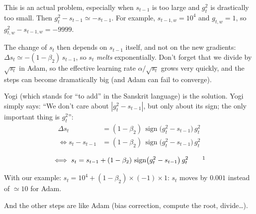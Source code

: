 This is an actual problem, especially when $s_{t-1}$ is too large and $g_t^2$ is drastically too small. Then $g_t^2-s_{t-1}\simeq-s_{t-1}$. For example, $s_{t-1,w}=10^4$ and $g_{t,w}=1$, so $g_{t,w}^2-s_{t-1,w}=-9999$.

The change of $s_t$ then depends on $s_{t-1}$ itself, and not on the new gradients: $\Delta s_t\simeq-(1-\beta_2)\,s_{t-1}$, so $s_t$ \emph{melts} exponentially. Don't forget that we divide by $\sqrt{s_t}$ in Adam, so the effective learning rate $\alpha/\sqrt{s_t}$ grows very quickly, and the steps can become dramatically big (and Adam can fail to converge).

\Prob[Solution]
Yogi (which stands for ``to add'' in the Sanskrit language) is the solution. Yogi simply says: ``We don't care about $|g_t^2-s_{t-1}|$, but only about its sign; the only important thing is $g_t^2$'':
\begin{align*}
\Delta s_t&=(1-\beta_2)\,\operatorname{sign}\bigl(g_t^2-s_{t-1}\bigr)\,g_t^2\\
\iff s_t-s_{t-1}&=(1-\beta_2)\,\operatorname{sign}\bigl(g_t^2-s_{t-1}\bigr)\,g_t^2
\end{align*}
\begin{keyformula}
\[
\iff s_t=s_{t-1}+(1-\beta_2)\,\operatorname{sign}\bigl(g_t^2-s_{t-1}\bigr)\,g_t^2
\qquad\text{\ednotemark}\]
\end{keyformula}

With our example: $s_t=10^4+(1-\beta_2)\times(-1)\times1$: $s_t$ moves by $0.001$ instead of $\simeq10$ for Adam.

And the other steps are like Adam (bias correction, compute the root, divide\ldots).
